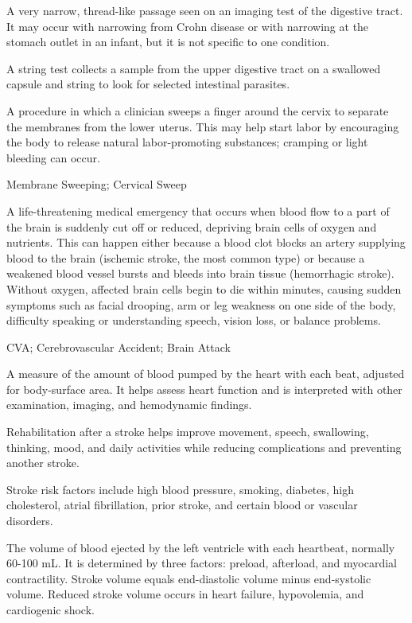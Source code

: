  A very narrow, thread-like passage seen on an imaging test of the digestive tract. It may occur with narrowing from Crohn disease or with narrowing at the stomach outlet in an infant, but it is not specific to one condition.

 A string test collects a sample from the upper digestive tract on a swallowed capsule and string to look for selected intestinal parasites.

 A procedure in which a clinician sweeps a finger around the cervix to separate the membranes from the lower uterus. This may help start labor by encouraging the body to release natural labor-promoting substances; cramping or light bleeding can occur.

\synonyms
Membrane Sweeping; Cervical Sweep

 A life-threatening medical emergency that occurs when blood flow to a part of the brain is suddenly cut off or reduced, depriving brain cells of oxygen and nutrients. This can happen either because a blood clot blocks an artery supplying blood to the brain (ischemic stroke, the most common type) or because a weakened blood vessel bursts and bleeds into brain tissue (hemorrhagic stroke). Without oxygen, affected brain cells begin to die within minutes, causing sudden symptoms such as facial drooping, arm or leg weakness on one side of the body, difficulty speaking or understanding speech, vision loss, or balance problems.


\synonyms
CVA; Cerebrovascular Accident; Brain Attack

 A measure of the amount of blood pumped by the heart with each beat, adjusted for body-surface area. It helps assess heart function and is interpreted with other examination, imaging, and hemodynamic findings.

 Rehabilitation after a stroke helps improve movement, speech, swallowing, thinking, mood, and daily activities while reducing complications and preventing another stroke.

 Stroke risk factors include high blood pressure, smoking, diabetes, high cholesterol, atrial fibrillation, prior stroke, and certain blood or vascular disorders.

 The volume of blood ejected by the left ventricle with each heartbeat, normally 60-100
mL. It is determined by three factors: preload, afterload, and myocardial contractility.
Stroke volume equals end-diastolic volume minus end-systolic volume. Reduced stroke
volume occurs in heart failure, hypovolemia, and cardiogenic shock.

